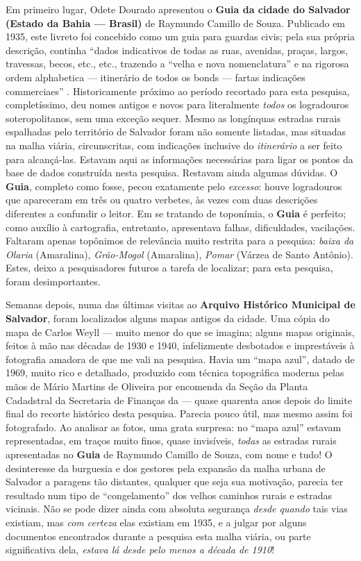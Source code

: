 Em primeiro lugar, Odete Dourado apresentou o \textbf{Guia da cidade do Salvador (Estado da Bahia --- Brasil)} de Raymundo Camillo de Souza. Publicado em 1935, este livreto foi concebido como um guia para guardas civis; pela sua própria descrição, continha ``dados indicativos de todas as ruas, avenidas, praças, largos, travessas, becos, etc., etc., trazendo a ``velha e nova nomenclatura'' e na rigorosa ordem alphabetica --- itinerário de todos os bonds --- fartas indicações commerciaes'' \cite{souza_guia_1935}. Historicamente próximo ao período recortado para esta pesquisa, completíssimo, deu nomes antigos e novos para literalmente \textit{todos} os logradouros soteropolitanos, sem uma exceção sequer. Mesmo as longínquas estradas rurais espalhadas pelo território de Salvador foram não somente listadas, mas situadas na malha viária, circunscritas, com indicações inclusive do \textit{itinerário} a ser feito para alcançá-las. Estavam aqui as informações necessárias para ligar os pontos da base de dados construída nesta pesquisa. Restavam ainda algumas dúvidas. O \textbf{Guia}, completo como fosse, pecou exatamente pelo \textit{excesso}: houve logradouros que apareceram em três ou quatro verbetes, às vezes com duas descrições diferentes a confundir o leitor. Em se tratando de toponímia, o \textbf{Guia} é perfeito; como auxílio à cartografia, entretanto, apresentava falhas, dificuldades, vacilações. Faltaram apenas topônimos de relevância muito restrita para a pesquisa: \textit{baixa da Olaria} (Amaralina), \textit{Grão-Mogol} (Amaralina), \textit{Pomar} (Várzea de Santo Antônio). Estes, deixo a pesquisadores futuros a tarefa de localizar; para esta pesquisa, foram desimportantes.

Semanas depois, numa das últimas visitas ao \textbf{Arquivo Histórico Municipal de Salvador}, foram localizados alguns mapas antigos da cidade. Uma cópia do mapa de Carlos Weyll --- muito menor do que se imagina; alguns mapas originais, feitos à mão nas décadas de 1930 e 1940, infelizmente desbotados e imprestáveis à fotografia amadora de que me vali na pesquisa. Havia um ``mapa azul'', datado de 1969, muito rico e detalhado, produzido com técnica topográfica moderna pelas mãos de Mário Martins de Oliveira por encomenda da Seção da Planta Cadadstral da Secretaria de Finanças da  --- quase quarenta anos depois do limite final do recorte histórico desta pesquisa. Parecia pouco útil, mas mesmo assim foi fotografado. Ao analisar as fotos, uma grata surpresa: no ``mapa azul'' estavam representadas, em traços muito finos, quase invisíveis, \textit{todas} as estradas rurais apresentadas no \textbf{Guia} de Raymundo Camillo de Souza, com nome e tudo! O desinteresse da burguesia e dos gestores pela expansão da malha urbana de Salvador a paragens tão distantes, qualquer que seja sua motivação, parecia ter resultado num tipo de ``congelamento'' dos velhos caminhos rurais e estradas vicinais. Não se pode dizer ainda com absoluta segurança \textit{desde quando} tais vias existiam, mas \textit{com certeza} elas existiam em 1935, e a julgar por alguns documentos encontrados durante a pesquisa esta malha viária, ou parte significativa dela, \textit{estava lá desde pelo menos a década de 1910}!

